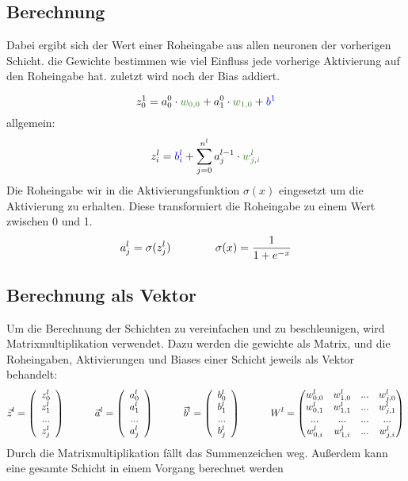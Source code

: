 \documentclass{article}
\begin{document}
\subsection{Berechnung}
Dabei ergibt sich der Wert einer Roheingabe aus allen neuronen der vorherigen Schicht.
die Gewichte bestimmen wie viel Einfluss jede vorherige Aktivierung auf den Roheingabe hat. zuletzt wird noch der Bias addiert.

\[ z_0^1 = a_0^0 \cdot \textcolor{OliveGreen}{w_{0,0}} + a_1^0 \cdot \textcolor{OliveGreen}{w_{1,0}} + \textcolor{blue}{b^1} \]
allgemein:
\[  z_i^l = \textcolor{blue}{b_i^l} + \sum_{j=0}^{n^l} a_j^{l-1} \cdot \textcolor{OliveGreen}{w_{j,i}^{l}} \]
Die Roheingabe wir in die Aktivierungsfunktion $\sigma(x)$ eingesetzt um die Aktivierung zu erhalten.
Diese transformiert die Roheingabe zu einem Wert zwischen 0 und 1.
\[ a_j^l = \sigma(z_j^l) 
\kern 40pt
\sigma(x) = \frac{1}{1 + e^{-x}} \]

\subsection{Berechnung als Vektor}
Um die Berechnung der Schichten zu vereinfachen und zu beschleunigen, wird Matrixmultiplikation verwendet.
Dazu werden die gewichte als Matrix, und die Roheingaben, Aktivierungen und Biases einer Schicht jeweils als Vektor behandelt:
\[ \vec{z}^l = \left(\begin{array}{c} z_0^l \\ z_1^l \\ ... \\ z_j^l \end{array}\right) 
\kern 30pt
\vec{a}^l = \left(\begin{array}{c} a_0^l \\ a_1^l \\ ... \\ a_j^l \end{array}\right) 
\kern 30pt
\vec{b}^l = \left(\begin{array}{c} b_0^l \\ b_1^l \\ ... \\ b_j^l \end{array}\right) 
\kern 30pt
W^l = \begin{pmatrix}
    w_{0,0}^l & w_{1,0}^l & ... & w_{j,0}^l \\
    w_{0,1}^l & w_{1,1}^l & ... & w_{j,1}^l \\
    ... & ... & ... & ... \\
    w_{0,i}^l & w_{1,i}^l & ... & w_{j,i}^l
\end{pmatrix} \]
Durch die Matrixmultiplikation fällt das Summenzeichen weg. Außerdem kann eine gesamte Schicht in einem Vorgang berechnet werden
\end{document}
